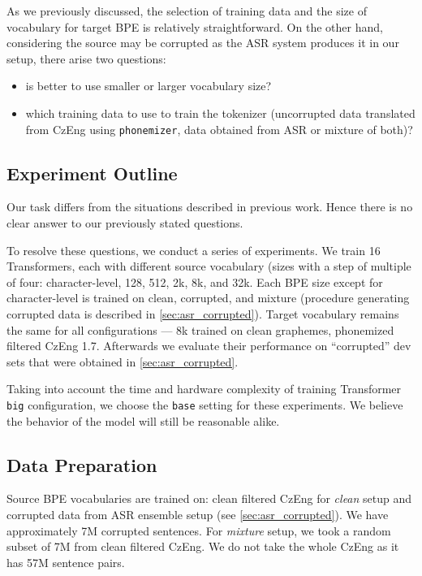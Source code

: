 As we previously discussed, the selection of training data and the size of vocabulary for target BPE is relatively straightforward. On the other hand, considering the source may be corrupted as the ASR system produces it in our setup, there arise two questions: 

\begin{itemize}
	\item is better to use smaller or larger vocabulary size?
	\item which training data to use to train the tokenizer (uncorrupted data translated from CzEng using \texttt{phonemizer}, data obtained from ASR or mixture of both)?
\end{itemize}



\subsection{Experiment Outline}
Our task differs from the situations described in previous work. Hence there is no clear answer to our previously stated questions.

To resolve these questions, we conduct a series of experiments. We train 16 Transformers, each with different source vocabulary (sizes with a step of multiple of four: character-level, 128, 512, 2k, 8k, and 32k. Each BPE size except for character-level is trained on clean, corrupted, and mixture (procedure generating corrupted data is described in \cref{sec:asr_corrupted}). Target vocabulary remains the same for all configurations --- 8k trained on clean graphemes, phonemized filtered CzEng 1.7. Afterwards we evaluate their performance on ``corrupted'' dev sets that were obtained in \cref{sec:asr_corrupted}.

Taking into account the time and hardware complexity of training Transformer \texttt{big} configuration, we choose the \texttt{base} setting for these experiments. We believe the behavior of the model will still be reasonable alike.

\subsection{Data Preparation}
Source BPE vocabularies are trained on: clean filtered CzEng for \textit{clean} setup and corrupted data from ASR ensemble setup (see \cref{sec:asr_corrupted}). We have approximately 7M corrupted sentences. For \textit{mixture} setup, we took a random subset of 7M from clean filtered CzEng. We do not take the whole CzEng as it has 57M sentence pairs. 


